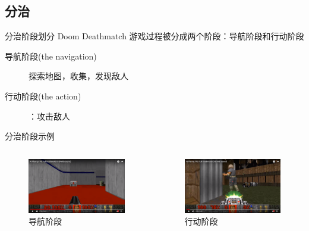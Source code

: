 \documentclass[10pt]{beamer}
\begin{document}
	\subsection{分治}
	
	\begin{frame}{分治}{阶段划分}
		Doom Deathmatch 游戏过程被分成两个阶段：导航阶段和行动阶段
		\begin{description}
			\item[导航阶段(the navigation)]  探索地图，收集，发现敌人
			\item[行动阶段(the action)]：攻击敌人
		\end{description}
		
	
	\end{frame}

	\begin{frame}{分治}{阶段示例}
		\begin{columns}
			\begin{column}{.5\linewidth}
				\begin{figure}
					\centering
					\includegraphics[width=0.9\linewidth]{pictures/deathmatch-2}
					\caption{导航阶段}
					\label{fig:deathmatch-2}
				\end{figure}
			\end{column}
			\begin{column}{.5\linewidth}
				\begin{figure}
					\centering
					\includegraphics[width=0.9\linewidth]{pictures/deathmatch-3}
					\caption{行动阶段}
					\label{fig:deathmatch-3}
				\end{figure}
				
			\end{column}
		\end{columns}
	\end{frame}
\end{document}
